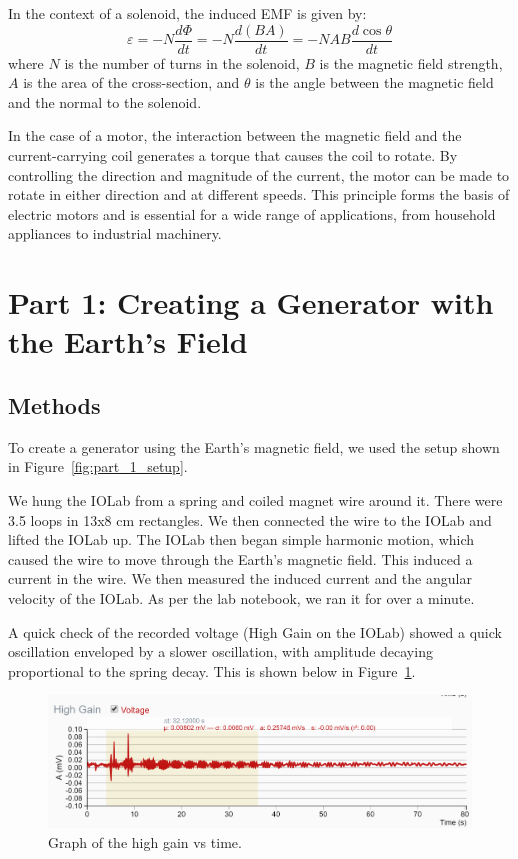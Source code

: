 \documentclass[11pt]{article}
\let\oldsection\section
\renewcommand\section{\clearpage\oldsection}
\begin{document}
    In the context of a solenoid, the induced EMF is given by:
    \begin{equation}
        \varepsilon = -N\frac{d\Phi}{dt} = -N\frac{d(BA)}{dt} = -NAB\frac{d\cos\theta}{dt}
        \label{eq:solenoid}
    \end{equation}
    where $N$ is the number of turns in the solenoid, $B$ is the magnetic field strength, $A$ is the area of the cross-section, and $\theta$ is the angle between the magnetic field and the normal to the solenoid.

    In the case of a motor, the interaction between the magnetic field and the current-carrying coil generates a torque that causes the coil to rotate.
    By controlling the direction and magnitude of the current, the motor can be made to rotate in either direction and at different speeds.
    This principle forms the basis of electric motors and is essential for a wide range of applications, from household appliances to industrial machinery.


    \section{Part 1: Creating a Generator with the Earth’s Field}\label{sec:part_1}

    \subsection{Methods}\label{subsec:part_1_methods}
    To create a generator using the Earth's magnetic field, we used the setup shown in Figure~\ref{fig:part_1_setup}.

    We hung the IOLab from a spring and coiled magnet wire around it.
    There were 3.5 loops in 13x8 cm rectangles.
    We then connected the wire to the IOLab and lifted the IOLab up.
    The IOLab then began simple harmonic motion, which caused the wire to move through the Earth's magnetic field.
    This induced a current in the wire.
    We then measured the induced current and the angular velocity of the IOLab.
    As per the lab notebook, we ran it for over a minute.

    A quick check of the recorded voltage (High Gain on the IOLab) showed a quick oscillation enveloped by a slower oscillation, with amplitude decaying proportional to the spring decay.
    This is shown below in Figure~\ref{fig:high_gain}.

    \begin{figure}[H]
        \centering
        \includegraphics[width=0.8\linewidth]{resources/images/high gain check}
        \caption{Graph of the high gain vs time.}
        \label{fig:high_gain}
    \end{figure}
\end{document}
